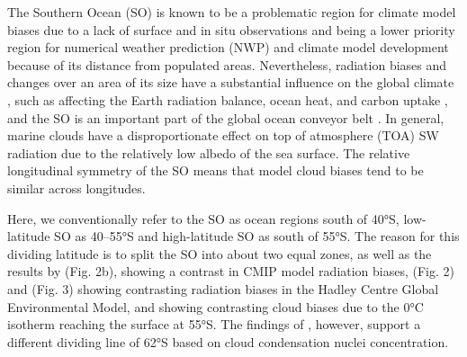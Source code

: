 \documentclass[draft]{agujournal2019}
\begin{document}
The Southern Ocean (SO) is known to be a problematic region for climate model biases \cite{schuddeboom2021,hyder2018,cesana2022,zhao2022} due to a lack of surface and in situ observations and being a lower priority region for numerical weather prediction (NWP) and climate model development because of its distance from populated areas. Nevertheless, radiation biases and changes over an area of its size have a substantial influence on the global climate \cite{rintoul2011}, such as affecting the Earth radiation balance, ocean heat, and carbon uptake \cite{williams2023}, and the SO is an important part of the global ocean conveyor belt \cite{wang2014b}. In general, marine clouds have a disproportionate effect on top of atmosphere (TOA) SW radiation due to the relatively low albedo of the sea surface. The relative longitudinal symmetry of the SO means that model cloud biases tend to be similar across longitudes.

Here, we conventionally refer to the SO as ocean regions south of 40°S, low-latitude SO as 40--55°S and high-latitude SO as south of 55°S. The reason for this dividing latitude is to split the SO into about two equal zones, as well as the results by  (Fig. 2b), showing a contrast in CMIP model radiation biases,  (Fig. 2) and  (Fig. 3) showing contrasting radiation biases in the Hadley Centre Global Environmental Model, and  showing contrasting cloud biases due to the 0°C isotherm reaching the surface at 55°S. The findings of , however, support a different dividing line of 62°S based on cloud condensation nuclei concentration.
\end{document}
